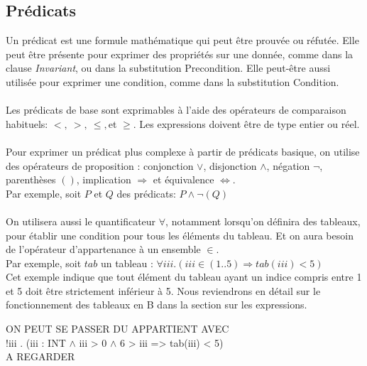 \subsection{Prédicats}

Un prédicat est une formule mathématique qui peut être prouvée ou
réfutée. Elle peut être présente pour exprimer des propriétés sur une
donnée, comme dans la clause \emph{Invariant}, ou dans la substitution
Precondition. Elle peut-être aussi utilisée pour exprimer une
condition, comme dans la substitution Condition.

\paragraph{}
Les prédicats de base sont exprimables à l'aide des opérateurs de
comparaison habituels: $<,~>,~\leq,$et $\geq$. Les expressions doivent
être de type entier ou réel.

\paragraph{}
Pour exprimer un prédicat plus complexe à partir de prédicats basique,
on utilise des opérateurs de proposition : conjonction $\vee$,
disjonction $\wedge$, négation $\neg$, parenthèses $()$, implication
$\Rightarrow$ et équivalence $\Leftrightarrow$.\\
Par exemple, soit $P$ et $Q$ des prédicats: $P\wedge\neg(Q)$

\paragraph{}
On utilisera aussi le quantificateur $\forall$, notamment lorsqu'on
définira des tableaux, pour établir une condition pour tous les
éléments du tableau. Et on aura besoin de l'opérateur d'appartenance à
un ensemble $\in$.\\
Par exemple, soit $tab$ un tableau : $\forall iii . (iii \in (1..5)
\Rightarrow tab(iii) < 5)$\\
Cet exemple indique que tout élément du tableau ayant un indice compris
entre 1 et 5 doit être strictement inférieur à 5. Nous reviendrons en
détail sur le fonctionnement des tableaux en B dans la section sur les
expressions.

ON PEUT SE PASSER DU APPARTIENT AVEC \\
!iii . (iii : INT $\wedge$ iii > 0 $\wedge$ 6 > iii => tab(iii) < 5) \\
A REGARDER

